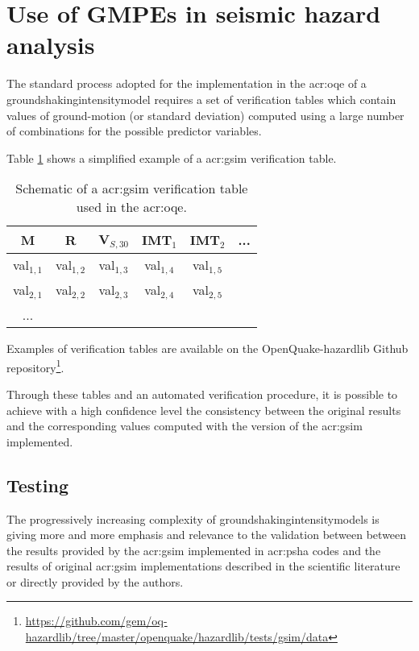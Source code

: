 %
\section{Use of GMPEs in seismic hazard analysis}
% 
The standard process adopted for the implementation in the \gls{acr:oqe} 
of a \gls{groundshakingintensitymodel} requires a 
set of verification tables which contain values of ground-motion (or standard 
deviation) computed using a large number of combinations for the possible 
predictor variables. 

Table \ref{tab:verification} shows a simplified example of a \gls{acr:gsim} 
verification table.
\begin{table}[!hb]
\centering
\begin{tabular}{|cccccc|}
\hline
\rowcolor{anti-flashwhite}
M & R & V$_{S,30}$ & IMT$_1$ & IMT$_2$ & ... \\
\hline 
val$_{1,1}$ & val$_{1,2}$ & val$_{1,3}$ & val$_{1,4}$ & val$_{1,5}$ & \\
val$_{2,1}$ & val$_{2,2}$ & val$_{2,3}$ & val$_{2,4}$ & val$_{2,5}$ & \\
... & & & & & \\
\hline
\end{tabular}
\caption{Schematic of a \gls{acr:gsim} verification table used in the 
\gls{acr:oqe}.}
\label{tab:verification}
\end{table}


Examples of verification tables are available on the OpenQuake-hazardlib Github
repository\footnote{
\href{https://github.com/gem/oq-hazardlib/tree/master/openquake/hazardlib/tests/gsim/data}{
https://github.com/gem/oq-hazardlib/tree/master/openquake/hazardlib/tests/gsim/data}
}.

Through these tables and an automated verification procedure, it is 
possible to achieve with a high confidence level the consistency between 
the original results and the corresponding values computed with the 
version of the \gls{acr:gsim} implemented.
%
\subsection{Testing}
%
The progressively increasing complexity of 
\glspl{groundshakingintensitymodel}
is giving more and more emphasis and relevance to the validation between 
between the results provided by the \gls{acr:gsim} implemented in
\gls{acr:psha} codes and the results of original \gls{acr:gsim} 
implementations described in the scientific literature or directly 
provided by the authors.

